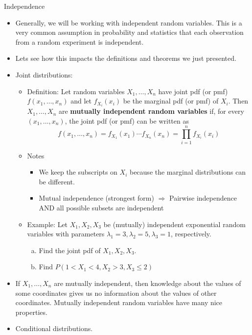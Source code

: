 \documentclass{article}
\newcommand{\vecn}[2]{#1_1, \ldots, #1_{#2}}	%
\begin{document}
Independence\bigskip
\begin{itemize}
    \item Generally, we will be working with independent random variables. This is a very common assumption in probability and statistics that each observation from a random experiment is independent.
    \item[] Lets see how this impacts the definitions and theorems we just presented.
    \item Joint distributions:
    \begin{itemize}
            \item Definition: Let random variables $\vecn{X}{n}$ have joint pdf (or pmf) $f(\vecn{x}{n})$ and let $f_{X_i}(x_i)$ be the marginal pdf (or pmf) of $X_i$. Then $\vecn{X}{n}$ are \textbf{mutually independent random variables} if, for every $(\vecn{x}{n})$, the joint pdf (or pmf) can be written as
        \[f(\vecn{x}{n}) = f_{X_1}(x_1) \cdots f_{X_n}(x_n) = \prod_{i = 1}^n f_{X_i}(x_i)\]
        \item Notes
        \begin{itemize}
            \item We keep the subscripts on $X_i$ because the marginal distributions can be different.
            \item Mutual independence (strongest form) $\Longrightarrow$ Pairwise independence AND all possible subsets are independent 
        \end{itemize}
        \item Example: Let $X_1, X_2, X_3$ be (mutually) independent exponential random variables with parameters $\lambda_1 = 3, \lambda_2 = 5, \lambda_3 = 1$, respectively.
        \begin{enumerate}[(a)]
            \item Find the joint pdf of $X_1, X_2, X_3$.\vspace{60pt}
            \item Find $P(1 < X_1 < 4, X_2 > 3, X_3 \le 2)$\vspace{120pt}
        \end{enumerate}
    \end{itemize}
    \item If $\vecn{X}{n}$ are mutually independent, then knowledge about the values of some coordinates gives us no information about the values of other coordinates. Mutually independent random variables have many nice properties.
    \item Conditional distributions.
    \begin{itemize}

\end{itemize}
\end{itemize}
\end{document}
